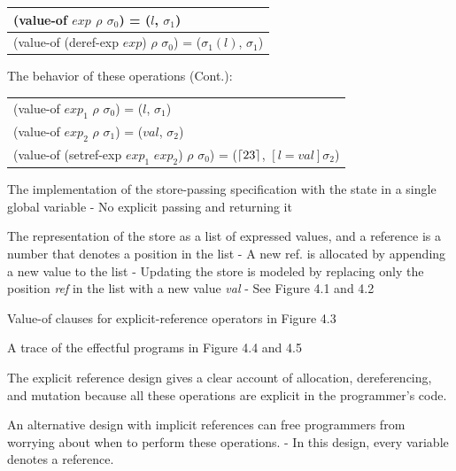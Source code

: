 \documentclass{article}
\begin{document}
\begin{huge}
\begin{tabular}{l}
(value-of $exp$ $\rho$ $\sigma_0$) = ($l$, $\sigma_1$)\\ \hline
(value-of (deref-exp $exp$) $\rho$ $\sigma_0$) = ($\sigma_1(l)$, $\sigma_1$) \\
\end{tabular}


The behavior of these operations (Cont.):

\begin{tabular}{l}
(value-of $exp_1$ $\rho$ $\sigma_0$) = ($l$, $\sigma_1$) \\
(value-of $exp_2$ $\rho$ $\sigma_1$) = ($val$, $\sigma_2$) \\ \hline
(value-of (setref-exp $exp_1$ $exp_2$) $\rho$ $\sigma_0$) = ($\lceil 23 \rceil$, $[l=val]\sigma_2$) \\
\end{tabular}


The implementation of the store-passing specification with the state in a single global variable \al
- No explicit passing and returning it

The representation of the store as a list of expressed values, and a reference is a number that denotes a 
position in the list \al
- A new ref. is allocated by appending a new value to the list\al
- Updating the store is modeled by replacing only the position {\it ref} in the list with a new value {\it val} \al
- See Figure 4.1 and 4.2

Value-of clauses for explicit-reference operators in Figure 4.3

A trace of the effectful programs in Figure 4.4 and 4.5



The explicit reference design gives a clear account of allocation, dereferencing, and mutation because all these operations are explicit in the programmer's code.

An alternative design with implicit references can free programmers from worrying about when to perform these operations. \al
- In this design, every variable denotes a reference. 


\end{huge}
\end{document}
